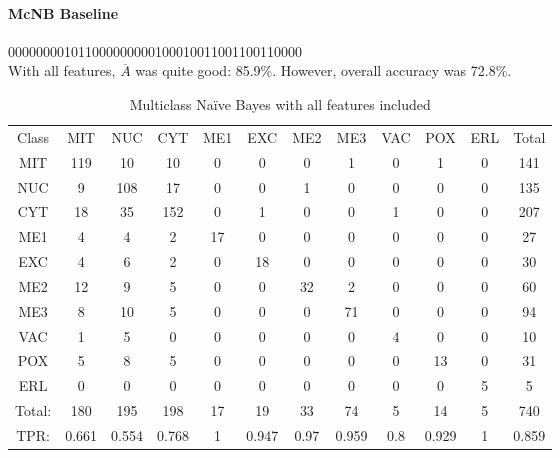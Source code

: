 \paragraph{McNB Baseline}
000000001011000000000100010011001100110000\\
With all features, $\overline{A}$ was quite good: 85.9\%.  However, overall accuracy was 72.8\%.  
\\
\begin{table}[h!]
\begin{tabular}{|c|c|c|c|c|c|c|c|c|c|c|c|}
	\hline
Class&MIT&NUC&CYT&ME1&EXC&ME2&ME3&VAC&POX&ERL&Total\\
MIT&119&10&10&0&0&0&1&0&1&0&141\\
NUC&9&108&17&0&0&1&0&0&0&0&135\\
CYT&18&35&152&0&1&0&0&1&0&0&207\\
ME1&4&4&2&17&0&0&0&0&0&0&27\\
EXC&4&6&2&0&18&0&0&0&0&0&30\\
ME2&12&9&5&0&0&32&2&0&0&0&60\\
ME3&8&10&5&0&0&0&71&0&0&0&94\\
VAC&1&5&0&0&0&0&0&4&0&0&10\\
POX&5&8&5&0&0&0&0&0&13&0&31\\
ERL&0&0&0&0&0&0&0&0&0&5&5\\
\hline
Total:&180&195&198&17&19&33&74&5&14&5&740\\
TPR:&0.661&0.554&0.768&1&0.947&0.97&0.959&0.8&0.929&1&0.859\\
\hline
\end{tabular}
\caption[Yeast:Multiclass Na\"ive Bayes without Feature Selection Confusion Matrix]{Multiclass Na\"ive Bayes with all features included}
\label{tab:yeastmcnbbase}
\end{table}

